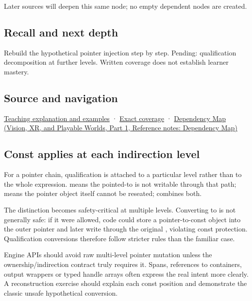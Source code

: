 Later sources will deepen this same node; no empty dependent nodes are created.

\subsection{Recall and next depth}\label{appendix-5e1a7561cd98-recall-and-next-depth}

\hypertarget{appendix-5e1a7561cd98-recall-and-next-depth}{}

Rebuild the hypothetical pointer injection step by step. Pending: qualification decomposition at further levels. Written coverage does not establish learner mastery.

\subsection{Source and navigation}\label{appendix-5e1a7561cd98-source-and-navigation}

\hypertarget{appendix-5e1a7561cd98-source-and-navigation}{}

\hyperref[01-foundations-i-ch003-read-only-is-a-path-not-an-ownership-or-synchronization-promise]{Teaching explanation and examples} · \hyperref[appendix-fd090d982a15-m008---parts-113-126]{Exact coverage} · \href{../07-Vision-XR-and-Playable-Worlds-P01/main.pdf\#appendix-4ad47bdd269a}{Dependency Map (Vision, XR, and Playable Worlds, Part 1, Reference notes: Dependency Map)}

\subsection{Const applies at each indirection level}\label{appendix-5e1a7561cd98-const-applies-at-each-indirection-level}

\hypertarget{appendix-5e1a7561cd98-const-applies-at-each-indirection-level}{}

For a pointer chain, qualification is attached to a particular level rather than to the whole expression.  means the pointed-to  is not writable through that path;  means the pointer object itself cannot be reseated;  combines both.

The distinction becomes safety-critical at multiple levels. Converting  to  is not generally safe: if it were allowed, code could store a pointer-to-const object into the outer pointer and later write through the original , violating const protection. Qualification conversions therefore follow stricter rules than the familiar  case.

Engine APIs should avoid raw multi-level pointer mutation unless the ownership/indirection contract truly requires it. Spans, references to containers, output wrappers or typed handle arrays often express the real intent more clearly. A reconstruction exercise should explain each const position and demonstrate the classic unsafe hypothetical conversion.
